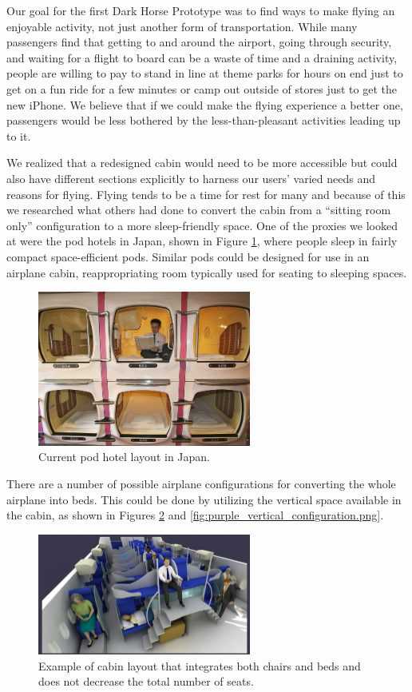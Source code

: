 Our goal for the first Dark Horse Prototype was to find ways to make flying an enjoyable activity, not just another form of transportation. While many passengers find that getting to and around the airport, going through security, and waiting for a flight to board can be a waste of time and a draining activity, people are willing to pay to stand in line at theme parks for hours on end just to get on a fun ride for a few minutes or camp out outside of stores just to get the new iPhone. We believe that if we could make the flying experience a better one, passengers would be less bothered by the less-than-pleasant activities leading up to it. 

We realized that a redesigned cabin would need to be more accessible but could also have different sections explicitly to harness our users’ varied needs and reasons for flying. Flying tends to be a time for rest for many and because of this we researched what others had done to convert the cabin from a “sitting room only” configuration to a more sleep-friendly space. One of the proxies we looked at were the pod hotels in Japan, shown in Figure \ref{fig:hotel_pod.jpg}, where people sleep in fairly compact space-efficient pods. Similar pods could be designed for use in an airplane cabin, reappropriating room typically used for seating to sleeping spaces.

\begin{figure}[h]
  \centering
     \includegraphics[width=7cm]{images/hotel_pod.jpg}
   \caption{Current pod hotel layout in Japan. \cite{hotel_pod}}
  \label{fig:hotel_pod.jpg}
\end{figure}

There are a number of possible airplane configurations for converting the whole airplane into beds. This could be done by utilizing the vertical space available in the cabin, as shown in Figures \ref{fig:blue_vertical_configuration.png} and \ref{fig:purple_vertical_configuration.png}. 

\begin{figure}[h]
  \centering
     \includegraphics[width=7cm]{images/blue_vertical_configuration.png}
   \caption{Example of cabin layout that integrates both chairs and beds and does not decrease the total number of seats. \cite{blue_vertical} }
  \label{fig:blue_vertical_configuration.png}
\end{figure} 

